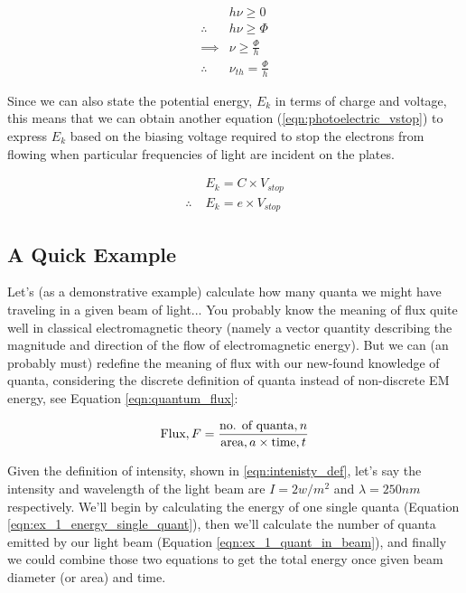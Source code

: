 \documentclass[../../Quantum-Technologies-Notes]{subfiles}
\begin{document}
			\begin{align}
				& \Planckconst \nu \geq 0 \nonumber\\
				\therefore \; & \Planckconst \nu \geq \Phi \nonumber\\
				\implies & \nu \geq \frac{\Phi}{\Planckconst} \nonumber\\
				\label{eqn:photoelectric_th} \therefore \; & \nu_{th} = \frac{\Phi}{\Planckconst}
			\end{align}
			
			Since we can also state the potential energy, $E_k$ in terms of charge and voltage, this means that we can obtain another equation (\ref{eqn:photoelectric_vstop}) to express $E_k$ based on the biasing voltage required to stop the electrons from flowing when particular frequencies of light are incident on the plates.
			
			\begin{align}
				& E_k = C \times V_{stop} \nonumber\\
				\label{eqn:photoelectric_vstop} \therefore \; & E_k = e \times V_{stop}
			\end{align}
		
		
		\subsection{A Quick Example}
			Let's (as a demonstrative example) calculate how many quanta we might have traveling in a given beam of light... \linebreak
			You probably know the meaning of flux quite well in classical electromagnetic theory (namely a vector quantity describing the magnitude and direction of the flow of electromagnetic energy). But we can (an probably must) redefine the meaning of flux with our new-found knowledge of quanta, considering the discrete definition of quanta instead of non-discrete EM energy, see Equation \ref{eqn:quantum_flux}:
			
			\begin{equation} \label{eqn:quantum_flux}
				\text{\normalsize Flux}, F = \frac{\text{\normalsize no. of quanta}, n}{\text{\normalsize area}, a \times \text{\normalsize time}, t}
			\end{equation}
			
			\vspace{5mm}
			
			Given the definition of intensity, shown in \ref{eqn:intenisty_def}, let's say the intensity and wavelength of the light beam are $I=2w/m^2$ and $\lambda=250nm$ respectively. We'll begin by calculating the energy of one single quanta (Equation \ref{eqn:ex_1_energy_single_quant}), then we'll calculate the number of quanta emitted by our light beam (Equation \ref{eqn:ex_1_quant_in_beam}), and finally we could combine those two equations to get the total energy once given beam diameter (or area) and time.
			
\end{document}
